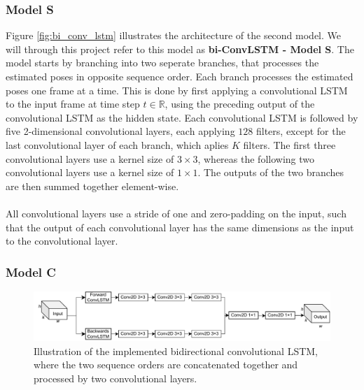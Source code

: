 \documentclass[./main.tex]{subfiles}
\begin{document}
\subsubsection{Model S}
Figure \ref{fig:bi_conv_lstm} illustrates the architecture of the second model. We will through this project refer to this model as \textbf{bi-ConvLSTM - Model S}. The model starts by branching into two seperate branches, that processes the estimated poses in opposite sequence order. Each branch processes the estimated poses one frame at a time. This is done by first applying a convolutional LSTM to the input frame at time step $t \in \mathbb{R}$, using the preceding output of the convolutional LSTM as the hidden state. Each convolutional LSTM is followed by five 2-dimensional convolutional layers, each applying $128$ filters, except for the last convolutional layer of each branch, which aplies $K$ filters. The first three convolutional layers use a kernel size of $3 \times 3$, whereas the following two convolutional layers use a kernel size of $1 \times 1$. The outputs of the two branches are then summed together element-wise.
\\
\\
All convolutional layers use a stride of one and zero-padding on the input, such that the output of each convolutional layer has the same dimensions as the input to the convolutional layer.

\subsubsection{Model C}
\begin{figure}[htbp]
    \centering
    \includegraphics[width=\textwidth]{./entities/unipose2.pdf}
    \caption{Illustration of the implemented bidirectional convolutional LSTM, where the two sequence orders are concatenated together and processed by two convolutional layers.}
    \label{fig:unipose2}
\end{figure}
\end{document}
